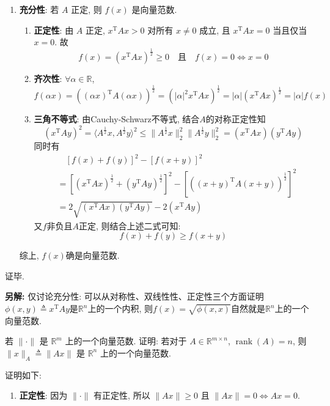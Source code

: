 \documentclass[12pt, answers]{exam}     %
\newcommand{\anothersolution}{\par\noindent\textbf{另解:}}
\newcommand{\R}{\mathbb{R}}
\newcommand{\T}{\mathrm{T}}
\begin{document}
\begin{questions}
\begin{solution}
\begin{enumerate}
    \item \textbf{充分性}: 若 \( A \) 正定, 则 \( f(x) \) 是向量范数.
    \begin{enumerate}
        \item \textbf{正定性}:
        由 \( A \) 正定, \( x^{\T}Ax > 0 \) 对所有 \( x \neq 0 \) 成立, 且 \( x^{\T}Ax = 0 \) 当且仅当 \( x = 0 \). 故
        \[ f(x) = (x^{\T}Ax)^{\frac{1}{2}} \geq 0 \quad \text{且} \quad f(x) = 0 \Leftrightarrow x = 0 \]

        \item \textbf{齐次性}:
        \( \forall \alpha \in \R \),
        \[ f(\alpha x) = ((\alpha x)^{\T}A(\alpha x))^{\frac{1}{2}} = (|\alpha|^2 x^{\T}Ax)^{\frac{1}{2}} = |\alpha| (x^{\T}Ax)^{\frac{1}{2}} = |\alpha| f(x) \]

        \item \textbf{三角不等式}:
        由Cauchy-Schwarz不等式, 结合$A$的对称正定性知
        \[
        \left(x^{\T}Ay \right)^2 = \langle A^{\frac{1}{2}}x, A^{\frac{1}{2}}y \rangle^2 \leq \|A^{\frac{1}{2}}x\|^2_2\|A^{\frac{1}{2}}y\|^2_2 = \left(x^{\T}Ax\right) \left(y^{\T}Ay\right)  
        \]
        同时有\begin{align*}
        &\quad \left[f(x) + f(y)\right]^2 - \left[f(x + y)\right]^2 \\
        &= \left[\left(x^{\T}Ax \right)^{\frac{1}{2}} + \left(y^{\T}Ay \right)^{\frac{1}{2}}\right]^2 - \left[\left((x + y)^{\T}A(x + y)\right)^{\frac{1}{2}}\right]^2  \\
        &= 2\sqrt{\left(x^{\T}Ax\right)\left(y^{\T}Ay\right)} - 2\left(x^{\T}Ay\right)
        \end{align*}
        又\(f\)非负且$A$正定, 则结合上述二式可知: \[ f(x) + f(y) \geq f(x + y) \]
    \end{enumerate}
    综上, $f(x)$确是向量范数.
\end{enumerate}
证毕.
\anothersolution{}
仅讨论充分性: 可以从对称性、双线性性、正定性三个方面证明$\phi(x, y) \triangleq x^{\T}Ay$是$\R^n$上的一个内积, 则$f(x) = \sqrt{\phi(x, x)}$自然就是$\R^n$上的一个向量范数.
\end{solution}

\question{}
若 $\|\cdot\|$ 是 $\R^m$ 上的一个向量范数. 证明: 若对于 $A \in \R^{m \times n}$, $\operatorname{rank}(A) = n$, 则
\(
\|x\|_A \triangleq \|A x\|
\)
是 $\R^n$ 上的一个向量范数. 

\begin{solution}
证明如下:
\begin{enumerate}
    \item \textbf{正定性}: 因为 $ \|\cdot\|$ 有正定性, 所以 $\|A x\| \geq 0$ 且 $\|A x\| = 0 \Leftrightarrow A x = 0$.


\end{enumerate}
\end{solution}
\end{questions}
\end{document}
